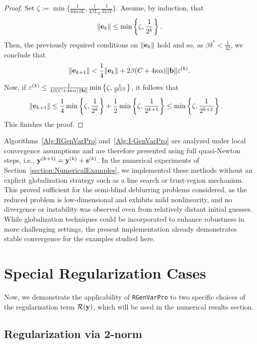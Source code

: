 \documentclass[onefignum,onetabnum]{siamart171218}
\newcommand{\bb}{{\bf b}}
\newcommand{\be}{{\bf e}}
\newcommand{\bs}{{\bf s}}
\newcommand{\by}{{\bf y}}
\begin{document}
\begin{proof}
Set $\zeta:=\min\{ \frac{1}{64\alpha\beta L}, \frac{1}{4\beta L_{\mathcal{R}}}\frac{1}{32 \beta T}\} $. Assume, by induction, that
$$\|\be_{k}\| \le \min \left\{\zeta, \frac{1}{2^{k}}\right\}.$$
Then, the previously required conditions on $\|\be_k\|$ hold and so, as $\beta\delta^* <\frac{1}{32}$, 
we conclude that  
$$\| \be_{k+1}\| < \frac{1}{4} \|\be_{k} \| + 2\beta (C  + 4\kappa \alpha )\| \bb\| \varepsilon^{(k)}. $$
Now, if $\varepsilon^{(k)}\le \frac{1}{4\beta (C + 4\kappa \alpha )\| \bb\|} \min \left\{ \zeta, \frac{1}{2^{k+1}}\right\}$, it follows that 
\begin{align*}
\| \be_{k+1}\| &\le \frac{1}{4}  \min \left\{\zeta, \frac{1}{2^k}\right\} +  \frac{1}{2}   \min \left\{ \zeta, \frac{1}{2^{k+1}}\right\}  \le \min \left\{ \zeta, \frac{1}{2^{k+1}}\right\}.
\end{align*}
This finishes the proof. \end{proof}

\begin{remark}
Algorithms~\ref{Alg:RGenVarPro} and~\ref{Alg:I-GenVarPro} are analyzed under local convergence assumptions and are therefore presented using full quasi-Newton steps, i.e., $\by^{(k+1)} = \by^{(k)} + \bs^{(k)}$. In the numerical experiments of Section~\ref{section:NumericalExamples}, we implemented these methods without an explicit globalization strategy such as a line search or trust-region mechanism. This proved sufficient for the semi-blind deblurring problems considered, as the reduced problem is low-dimensional and exhibits mild nonlinearity, and no divergence or instability was observed even from relatively distant initial guesses. While globalization techniques could be incorporated to enhance robustness in more challenging settings, the present implementation already demonstrates stable convergence for the examples studied here.
\end{remark}


\section{Special Regularization Cases}\label{section:special_cases}
Now, we demonstrate the applicability of \linebreak \texttt{RGenVarPro} to two specific choices of the regularization term $\mathcal{R}(\by)$, which will be used in the numerical results section. 

\subsection{Regularization via 2-norm}\label{subsec:2-norm}
\end{document}
